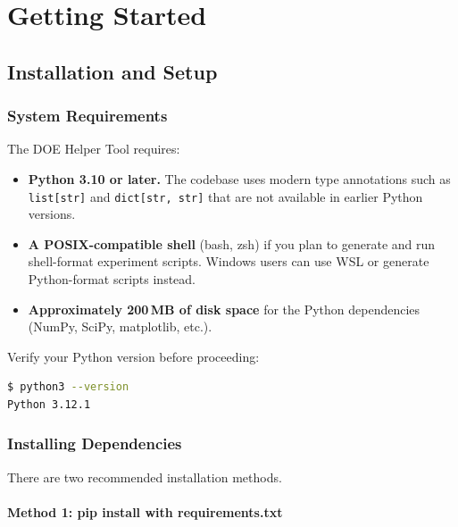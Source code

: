\documentclass[11pt]{book}
\begin{document}
\mainmatter

\part{Getting Started}

\chapter{Installation and Setup}
\label{ch:install}

\section{System Requirements}

The DOE Helper Tool requires:

\begin{itemize}[nosep]
  \item \textbf{Python 3.10 or later.} The codebase uses modern type annotations such as \texttt{list[str]} and \texttt{dict[str, str]} that are not available in earlier Python versions.
  \item \textbf{A POSIX-compatible shell} (bash, zsh) if you plan to generate and run shell-format experiment scripts. Windows users can use WSL or generate Python-format scripts instead.
  \item \textbf{Approximately 200\,MB of disk space} for the Python dependencies (NumPy, SciPy, matplotlib, etc.).
\end{itemize}

Verify your Python version before proceeding:

\begin{lstlisting}[language=bash]
$ python3 --version
Python 3.12.1
\end{lstlisting}

\section{Installing Dependencies}

There are two recommended installation methods.

\subsection{Method 1: pip install with requirements.txt}
\end{document}
